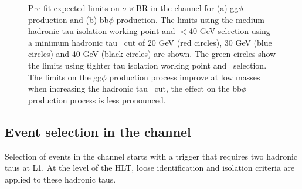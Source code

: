 \begin{figure}[h!]
\begin{center}
\end{center}
\caption{Pre-fit expected limits on $\sigma\times$BR in the \etau channel for (a) gg$\phi$ production and (b) bb$\phi$ production. The
limits using the medium hadronic tau isolation working point and \mT$<40$ GeV selection using a minimum
hadronic tau \pT~cut of 20 GeV (red circles), 30 GeV (blue circles) and 40 GeV (black circles) are shown. The green
circles show the limits using tighter tau isolation working point and \mT~selection. The limits on
the gg$\phi$ production process improve at low masses when increasing the hadronic tau \pT~cut,
the effect on the bb$\phi$ production process is less pronounced.}
\label{fig:mssm_tauptcut_et}
\end{figure}


\subsection{\texorpdfstring{Event selection in the \tautau channel}{Event selection in the tau tau channel}}
\label{sec:mssm_eventsel_tt}
Selection of events in the \tautau channel starts with a trigger
that requires two hadronic taus at \ac{L1}. At the level of the \ac{HLT}, loose identification
and isolation criteria are applied to these hadronic taus.

